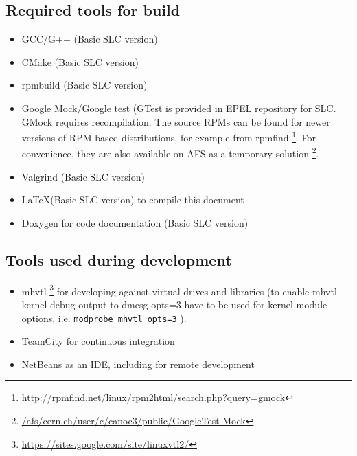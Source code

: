 \subsection{Required tools for build}
\begin{itemize}
\item{}GCC/G++ (Basic SLC version)
\item{}CMake (Basic SLC version)
\item{}rpmbuild (Basic SLC version)
\item{}Google Mock/Google test (GTest is provided in EPEL repository for SLC. 
  GMock requires recompilation. The source RPMs can be found for newer versions of RPM based distributions, for example from rpmfind 
  \footnote{ \href{http://rpmfind.net/linux/rpm2html/search.php?query=gmock}{http://rpmfind.net/linux/rpm2html/search.php?query=gmock} }.
 For convenience, 
  they are also available on AFS as a temporary solution
      \footnote{ \href{file:///afs/cern.ch/user/c/canoc3/public/GoogleTest-Mock}{/afs/cern.ch/user/c/canoc3/public/GoogleTest-Mock} }.
\item{}Valgrind (Basic SLC version)
\item{}\LaTeX (Basic SLC version) to compile this document
\item{}Doxygen for code documentation (Basic SLC version)
\end{itemize}

\subsection{Tools used during development}
\begin{itemize}
\item{}mhvtl \footnote{ \href{https://sites.google.com/site/linuxvtl2/}{https://sites.google.com/site/linuxvtl2/} } for developing against virtual drives and libraries (to enable mhvtl kernel debug output to dmesg opts=3 have to be used for kernel module options, i.e.
\small{}\verb#modprobe mhvtl opts=3# ).
\item{}TeamCity for continuous integration
\item{}NetBeans as an IDE, including for remote development\
\end{itemize}

